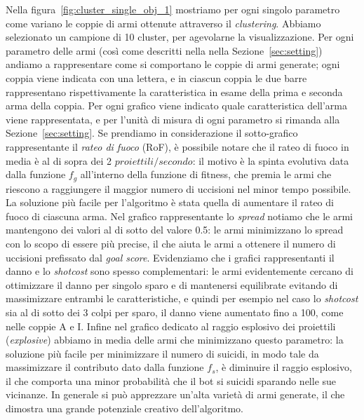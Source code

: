 \documentclass[12pt, italian]{toptesi}
\begin{document}
Nella figura~\ref{fig:cluster_single_obj_1} mostriamo per ogni singolo parametro come variano le coppie di armi ottenute attraverso il \emph{clustering}. Abbiamo selezionato un campione di 10 cluster, per agevolarne la visualizzazione.
Per ogni parametro delle armi (così come descritti nella nella Sezione~\ref{sec:setting}) andiamo a rappresentare come si comportano le coppie di armi generate; ogni coppia viene indicata con una lettera, e in ciascun coppia le due barre rappresentano rispettivamente la caratteristica in esame della prima e seconda arma della coppia.
Per ogni grafico viene indicato quale caratteristica dell'arma viene rappresentata, e per l'unità di misura di ogni parametro si rimanda alla Sezione~\ref{sec:setting}.
Se prendiamo in considerazione il sotto-grafico rappresentante il \emph{rateo di fuoco} (RoF), è possibile notare che il rateo di fuoco in media è al di sopra dei 2 $proiettili/secondo$: il motivo è la spinta evolutiva data dalla funzione $f_g$ all'interno della funzione di fitness, che premia le armi che riescono a raggiungere il maggior numero di uccisioni nel minor tempo possibile. La soluzione più facile per l'algoritmo è stata quella di aumentare il rateo di fuoco di ciascuna arma.
Nel grafico rappresentante lo \emph{spread} notiamo che le armi mantengono dei valori al di sotto del valore 0.5: le armi minimizzano lo spread con lo scopo di essere più precise, il che aiuta le armi a ottenere il numero di uccisioni prefissato dal \emph{goal score}.
Evidenziamo che i grafici rappresentanti il danno e lo \emph{shotcost} sono spesso complementari: le armi evidentemente cercano di ottimizzare il danno per singolo sparo e di mantenersi equilibrate evitando di massimizzare entrambi le caratteristiche, e quindi per esempio nel caso lo \emph{shotcost} sia al di sotto dei 3 colpi per sparo, il danno viene aumentato fino a 100, come nelle coppie A e I.
Infine nel grafico dedicato al raggio esplosivo dei proiettili (\emph{explosive}) abbiamo in media delle armi che minimizzano questo parametro: la soluzione più facile per minimizzare il numero di suicidi, in modo tale da massimizzare il contributo dato dalla funzione $f_s$, è diminuire il raggio esplosivo, il che comporta una minor probabilità che il bot si suicidi sparando nelle sue vicinanze.
In generale si può apprezzare un'alta varietà di armi generate, il che dimostra una grande potenziale creativo dell'algoritmo.
\end{document}
